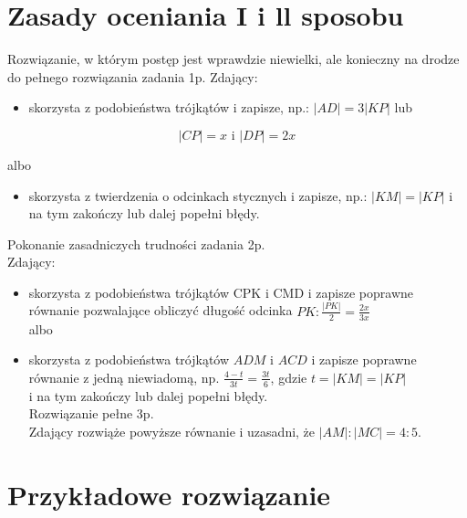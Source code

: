 \documentclass[10pt]{article}
\begin{document}
\section*{Zasady oceniania I i ll sposobu}
Rozwiązanie, w którym postęp jest wprawdzie niewielki, ale konieczny na drodze do pełnego rozwiązania zadania 1p. Zdający:

\begin{itemize}
  \item skorzysta z podobieństwa trójkątów i zapisze, np.: $|A D|=3|K P|$ lub
\end{itemize}

$$
|C P|=x \text { i }|D P|=2 x
$$

albo

\begin{itemize}
  \item skorzysta z twierdzenia o odcinkach stycznych i zapisze, np.: $|K M|=|K P|$ i na tym zakończy lub dalej popełni błędy.
\end{itemize}

Pokonanie zasadniczych trudności zadania 2p.\\
Zdający:

\begin{itemize}
  \item skorzysta z podobieństwa trójkątów CPK i CMD i zapisze poprawne równanie pozwalające obliczyć długość odcinka $P K: \frac{|P K|}{2}=\frac{2 x}{3 x}$\\
albo
  \item skorzysta z podobieństwa trójkątów $A D M$ i $A C D$ i zapisze poprawne równanie z jedną niewiadomą, np. $\frac{4-t}{3 t}=\frac{3 t}{6}$, gdzie $t=|K M|=|K P|$\\
i na tym zakończy lub dalej popełni błędy.\\
Rozwiązanie pełne 3p.\\
Zdający rozwiąże powyższe równanie i uzasadni, że $|A M|:|M C|=4: 5$.
\end{itemize}

\section*{Przykładowe rozwiązanie}
\end{document}
